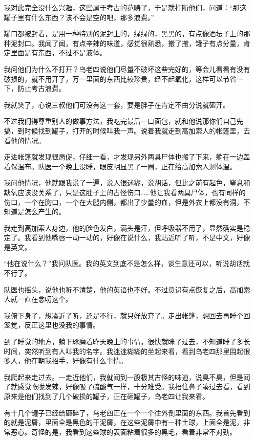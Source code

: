 我对此完全没什么兴趣，这些属于考古的范畴了，于是就打断他们，问道：“那这罐子里有什么东西？该不会是空的吧，那多浪费。”

罐口都被封着，是用一种特别的泥封上的，绿绿的，黑黑的，有点像酒坛子上的那种泥封口。我闻了闻，有点辛辣的味道，感觉很熟悉，搬了搬，罐子有点分量，肯定里面是有东西，不过不是液体。

我问他们为什么不打开？乌老四说他们尽量不破坏这些完好的，等会儿看看有没有破损的，就不用开了，万一里面的东西比较珍贵，经不起氧化，这样可以节省一下，防止考古浪费。

我就笑了，心说三叔他们可没有这一套，要是胖子在肯定不由分说就砸开。

不过我们得尊重别人的做事方法，我吃完最后一口面包，就和他说那你们自己先搞，到时候找到罐子，打开的时候叫我一声。说着我就走到高加索人的帐篷里，去看他的情况。

走进帐篷就发现很局促，仔细一看，才发现另外两具尸体也搬了下来，躺在一边盖着保温布。队医一个晚上没睡，眼皮明显黑了一圈，正在给高加索人测体温。

我问他情况，他就跟我说了一遍，说人很迷糊，说胡话，但比之前有起色，窒息和缺氧应该没关系了，只是这肚子上的古怪伤口……他让我看两具尸体，也有同样的伤口，一个在胸口，一个在大腿内侧，都出了少量的血，但是外衣上都没有洞，不知道是怎么产生的。

我走到高加索人身边，他的脸色发白，满头是汗，但呼吸器不用了，显然确实是稳定了。我看到他嘴唇一动一动的，好像在说什么，我贴近听了听，不是中文，好像是英文。

“他在说什么？”我问队医。我的英文到底不是怎么样，谈生意还可以，听说胡话就不行了。

队医也摇头，说他也听不清楚，他的英语也不好。不过意识有点恢复之后，高加索人就一直在念叨这个。

我俯下身子，想凑近了听，还是不行，就只好放弃了。走出帐篷，想回去再睡个回笼觉，反正这里也没我的事情。

到了睡觉的地方，躺下琢磨着昨天晚上的事情，很快就眯了过去，不知道睡了多长时间，突然听到有人叫我的名字。我迷迷糊糊的坐起来看，看到乌老四那里围起很多人，他在朝我招手，好像有什么事情。

我爬起来走过去。一走近他们，我就闻到一股极其古怪的味道，说臭不臭，但是闻了就感觉喉咙发辣，好像吸了硫酸气一样，十分难受。我捂住鼻子凑过去看，看到原来是他们找到了几个破损的罐子，正在砸罐子，乌老四让我来看。

有十几个罐子已经给砸碎了，乌老四正在一个一个往外倒里面的东西。我首先看到的就是泥屑，里面全是黑色的干泥屑，在这些泥屑中有一种土球，上面全是泥，非常恶心。奇怪的是，我看到这些球的表面粘着很多的黑毛，看着非常不对劲。

